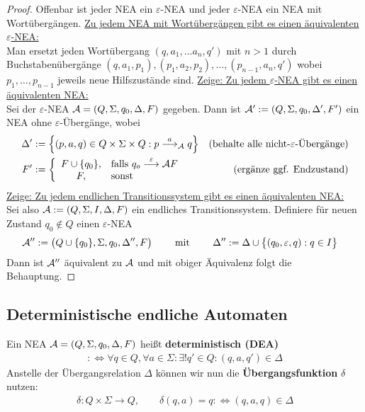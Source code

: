 \begin{proof}
	Offenbar ist jeder NEA ein $\varepsilon$-NEA und jeder $\varepsilon$-NEA ein NEA mit Wortübergängen.\nl
	\underline{Zu jedem NEA mit Wortübergängen gibt es einen äquivalenten $\varepsilon$-NEA:}\\
	Man ersetzt jeden Wortübergang $(q,a_1,\ldots a_n,q')$ mit $n>1$ durch Buchstabenübergänge $(q,a_1,p_1),(p_1,a_2,p_2),\ldots,(p_{n-1},a_n,q')$ wobei $p_1,\ldots,p_{n-1}$ jeweils neue Hilfszustände sind.\nl	
	\underline{Zeige: Zu jedem $\varepsilon$-NEA gibt es einen äquivalenten NEA:}\\
	Sei der $\varepsilon$-NEA $\mathcal{A}=(Q,\Sigma,q_0,\Delta,F)$ gegeben.
	Dann ist $\mathcal{A}':=(Q,\Sigma,q_0,\Delta', F')$ ein NEA ohne $\varepsilon$-Übergänge, wobei
	\begin{align*}
		\Delta'&:=\left\lbrace (p,a,q)\in Q\times \Sigma\times Q:p\overset{a}{\longrightarrow}_{\mathcal{A}} q\right\rbrace &\text{(behalte alle nicht-$\varepsilon$-Übergänge)}\\
		F'&:=\left\lbrace\begin{array}{cl}
			F\cup\lbrace q_0\rbrace ,&\text{falls } q_o\overset{\varepsilon}{\longrightarrow}\mathcal{A} F\\
			F ,&\text{sonst }
		\end{array}\right. &\text{(ergänze ggf. Endzustand)}
	\end{align*}
	\underline{Zeige: Zu jedem endlichen Transitionssystem gibt es einen äquivalenten NEA:}\\
	Sei also $\mathcal{A}:=(Q,\Sigma,I,\Delta,F)$ ein endliches Transitionssystem.
	Definiere für neuen Zustand $q_0\not\in Q$ einen $\varepsilon$-NEA
	\begin{align*}
		\mathcal{A}''&:=\big(Q\cup\lbrace q_0\rbrace,\Sigma,q_0,\Delta'',F\big)\qquad\text{ mit }\qquad
		\Delta'':=\Delta\cup\big\lbrace(q_0,\varepsilon,q):q\in I\big\rbrace
	\end{align*}
	Dann ist $\mathcal{A}''$ äquivalent zu $\mathcal{A}$ und mit obiger Äquivalenz folgt die Behauptung.
\end{proof}

\subsection{Deterministische endliche Automaten}

\begin{definition}\label{def2.1}
	Ein NEA $\mathcal{A}=(Q,\Sigma,q_0,\Delta,F)$ heißt \textbf{deterministisch (DEA)} 
	\begin{align*}
		:\Longleftrightarrow\forall q\in Q,\forall a\in\Sigma:\exists! q'\in Q:(q,a,q')\in\Delta
	\end{align*}
	Anstelle der Übergangsrelation $\Delta$ können wir nun die \textbf{Übergangsfunktion} $\delta$ nutzen:
	\begin{align*}
		\delta:Q\times\Sigma\to Q,\qquad\delta(q,a)=q:\Longleftrightarrow(q,a,q)\in\Delta
	\end{align*}
\end{definition}

